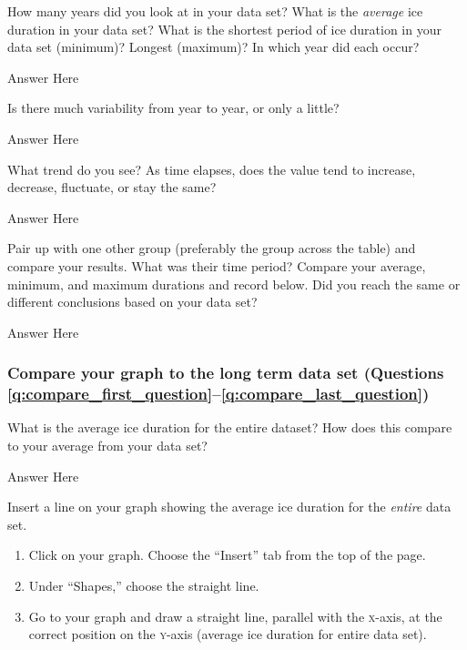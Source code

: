 \documentclass[12pt, hidelinks, addpoints]{exam}
\newcommand*\AnswerBox[2]{%
    \parbox[t][#1]{0.92\textwidth}{%
    \begin{solution}#2\end{solution}}
    \vspace*{\stretch{1}}
}
\begin{document}
\begin{questions}
\begin{enumerate}
\end{enumerate}

\question[1]
How many years did you look at in your data set? What is the
\emph{average} ice duration in your data set? What is the shortest
period of ice duration in your data set (minimum)? Longest (maximum)? In
which year did each occur?

\AnswerBox{3\baselineskip}{Answer Here}

\question[1]
Is there much variability from year to year, or only a little?

\AnswerBox{3\baselineskip}{Answer Here}

\question[1]
What trend do you see? As time elapses, does the value tend to increase,
decrease, fluctuate, or stay the same?

\AnswerBox{3\baselineskip}{Answer Here}

\question[1]
Pair up with one other group (preferably the group across the table)
and compare your results. What was their time period? Compare your
average, minimum, and maximum durations and record below. Did you reach
the same or different conclusions based on your data set?

\AnswerBox{3\baselineskip}{Answer Here}


\newpage

\subsubsection*{Compare your graph to the long term data set (Questions \ref{q:compare_first_question}–\ref{q:compare_last_question})}

\question[1]\label{q:compare_first_question}
What is the average ice duration for the entire dataset? How does
this compare to your average from your data set?

\AnswerBox{1\baselineskip}{Answer Here}

Insert a line on your graph showing the average ice duration for the
\emph{entire} data set. 

\begin{enumerate}
\item Click on your graph. Choose the ``Insert'' tab from the top of the
page.

\item Under ``Shapes,'' choose the straight line.

\item Go to your graph and draw a straight line, parallel with the \textsc{x}-axis,
at the correct position on the \textsc{y}-axis (average ice duration for entire
data set).
\end{enumerate}


\end{questions}
\end{document}

